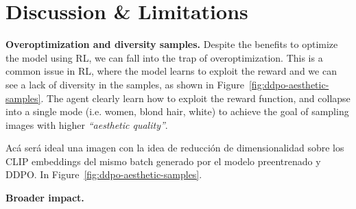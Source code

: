 \section{Discussion \& Limitations}

\noindent\textbf{Overoptimization and diversity samples.} Despite the benefits 
to optimize the model using RL, we can fall into the trap of overoptimization.
This is a common issue in RL, where the model learns to exploit the reward
and we can see a lack of diversity in the samples, as shown in Figure~\ref{fig:ddpo-aesthetic-samples}. The agent clearly learn how to exploit the reward
function, and collapse into a single mode (i.e. women, blond hair, white) to
achieve the goal of sampling images with higher \textit{``aesthetic quality''}.

Acá será ideal una imagen con la idea de reducción de dimensionalidad sobre los CLIP embeddings del mismo batch generado por el modelo preentrenado y DDPO.  In Figure~\ref{fig:ddpo-aesthetic-samples}.

\noindent\textbf{Broader impact.} 


